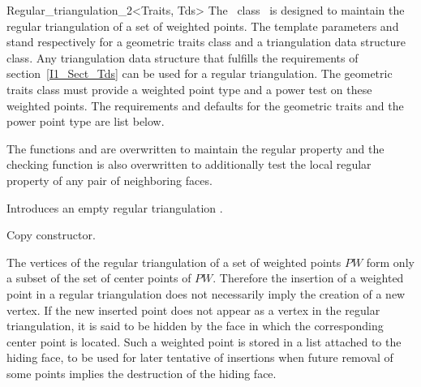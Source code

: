 \begin{ccClassTemplate}{Regular_triangulation_2<Traits, Tds>}
The \cgal\  class \ccClassTemplateName\ is designed to maintain the
regular triangulation of a set of weighted points.
The template parameters   and  stand respectively
 for a geometric traits class and a triangulation data structure class.
Any triangulation data structure that fulfills the requirements of 
section~\ref{I1_Sect_Tds} can be used for a regular triangulation.
The geometric traits class must provide a weighted point type
and a power test on these weighted points. The requirements and defaults
for the geometric traits and the power point type are list below.


 \ccInheritsFrom


The functions  and 
 are overwritten to maintain the regular
property
and the checking function  is also overwritten
to additionally test the local regular property of 
any pair of neighboring faces.

\ccTypes
{}
\ccThreeToTwo
{}

\ccGlue
{}
\ccGlue
{}
\ccGlue
{}
\ccGlue
{}

\ccCreation
{}

{Introduces an empty regular triangulation \ccVar.}

{Copy constructor.}



The vertices of the regular triangulation
of a set of weighted points ${  PW}$ form only a subset
of the set of center points of ${   PW}$.
Therefore the  insertion of a weighted point  in a regular triangulation
does not necessarily imply the creation of a new vertex.
If the new inserted point does not appear as a vertex in the
regular triangulation, it is said to be hidden 
by the face in which the corresponding center point is located.
Such a weighted point is stored in a list attached to the hiding face,
to be used for later tentative of insertions when future removal
of some points implies the destruction of the hiding face.



\end{ccClassTemplate}
